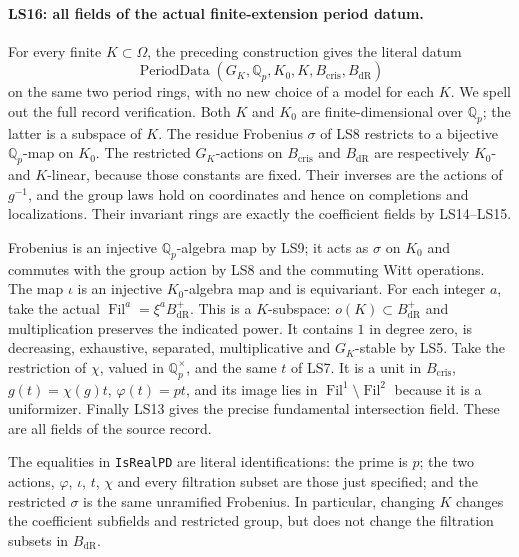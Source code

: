 \paragraph{LS16: all fields of the actual finite-extension period datum.}
For every finite $K\subset\Omega$, the preceding construction
gives the literal datum
\[
 \operatorname{PeriodData}
   (G_K,\mathbb Q_p,K_0,K,B_{\mathrm{cris}},B_{\mathrm{dR}})
                                                               \tag{LS.38}
\]
on the same two period rings, with no new choice of a model for
each $K$. We spell out the full record verification. Both $K$
and $K_0$ are finite-dimensional over $\mathbb Q_p$; the latter
is a subspace of $K$. The residue Frobenius $\sigma$ of LS8
restricts to a bijective $\mathbb Q_p$-map on $K_0$.
The restricted $G_K$-actions on $B_{\mathrm{cris}}$ and
$B_{\mathrm{dR}}$ are respectively $K_0$- and $K$-linear,
because those constants are fixed. Their inverses are the actions
of $g^{-1}$, and the group laws hold on coordinates and hence
on completions and localizations. Their invariant rings are
exactly the coefficient fields by LS14--LS15.

Frobenius is an injective $\mathbb Q_p$-algebra map by LS9;
it acts as $\sigma$ on $K_0$ and commutes with the group action
by LS8 and the commuting Witt operations. The map $\iota$ is an
injective $K_0$-algebra map and is equivariant. For each integer
$a$, take the actual $\operatorname{Fil}^a=\xi^aB_{\mathrm{dR}}^+$.
This is a $K$-subspace: $o(K)\subset B_{\mathrm{dR}}^+$ and
multiplication preserves the indicated power. It contains $1$
in degree zero, is decreasing, exhaustive, separated,
multiplicative and $G_K$-stable by LS5.
Take the restriction of $\chi$, valued in $\mathbb Q_p^\times$,
and the same $t$ of LS7. It is a unit in $B_{\mathrm{cris}}$,
$g(t)=\chi(g)t$, $\varphi(t)=pt$, and its image lies in
$\operatorname{Fil}^1\setminus\operatorname{Fil}^2$ because
it is a uniformizer. Finally LS13 gives the precise fundamental
intersection field. These are all fields of the source record.

The equalities in \texttt{IsRealPD} are literal identifications:
the prime is $p$; the two actions, $\varphi$, $\iota$, $t$,
$\chi$ and every filtration subset are those just specified;
and the restricted $\sigma$ is the same unramified Frobenius.
In particular, changing $K$ changes the coefficient subfields and
restricted group, but does not change the filtration subsets in
$B_{\mathrm{dR}}$.

